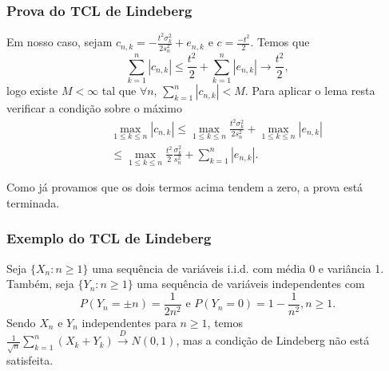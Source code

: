 \begin{frame}
\frametitle{\textbf{Prova do TCL de Lindeberg}}
\baselineskip=13pt
\begin{block}{}


Em nosso caso, sejam $c_{n,k}=-\frac{t^2\sigma_k^2}{2s_n^2}+e_{n,k}$
e $c=\frac{-t^2}{2}$. Temos que
$$\sum_{k=1}^{n}|c_{n,k}|\leq \frac{t^2}{2}+\sum_{k=1}^{n}|e_{n,k}|\rightarrow \frac{t^2}{2},$$
logo existe $M<\infty$ tal que $\forall n$,
$\sum_{k=1}^{n}|c_{n,k}|<M$. Para aplicar o lema resta verificar a
condição sobre o máximo
\begin{eqnarray}
& & \max_{1\leq k\leq n}|c_{n,k}|\leq \max_{1\leq k\leq n}\frac{t^2\sigma_k^2}{2s_n^2}+\max_{1\leq k\leq n}|e_{n,k}|\nonumber\\
& & \leq \max_{1\leq k\leq n}\frac{t^2}{2}\frac{\sigma_k^2}{s_n^2}+\sum_{k=1}^{n}|e_{n,k}|.\nonumber
\end{eqnarray}

Como já provamos que os dois termos acima tendem a zero, a prova
está terminada.

\end{block}
\end{frame}

\begin{frame}
\frametitle{\textbf{Exemplo do TCL de Lindeberg}}
\baselineskip=13pt
\begin{block}{}

Seja $\{X_n:n\geq 1\}$ uma sequência de variáveis i.i.d. com média 0 e variância 1. Também, seja $\{Y_n:n\geq 1\}$ uma sequência de variáveis independentes com
$$P(Y_n=\pm n)=\frac{1}{2n^2}\mbox{ e }P(Y_n=0)=1-\frac{1}{n^2},n\geq 1.$$
Sendo $X_n$ e $Y_n$ independentes para $n\geq 1$, temos $\frac{1}{\sqrt{n}}\sum_{k=1}^{n}(X_k+Y_k)\xrightarrow{D}N(0,1)$, mas a condição de Lindeberg não está satisfeita.

\end{block}
\end{frame}

